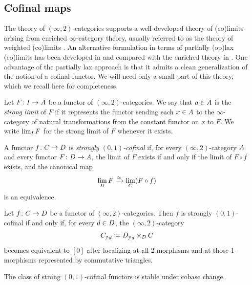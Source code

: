 \documentclass[a4paper,reqno,twoside]{amsart}
\begin{document}
\subsection{Cofinal maps}
The theory of $(\infty,2)$-categories supports a well-developed theory of (co)limits arising from enriched $\infty$-category theory, usually referred to as the theory of weighted (co)limits \cite{Heine2024HigherAlgebraWeightedColimits}. An alternative formulation in terms of partially (op)lax (co)limits has been developed in \cite{GagnaHarpazLanari2026MarkedLimits,AHM26} and compared with the enriched theory in \cite[Section 5.2]{AHM26}. One advantage of the partially lax approach is that it admits a clean generalization of the notion of a cofinal functor. We will need only a small part of this theory, which we recall here for completeness.

\begin{definition}
	Let $F \colon \relax{I} \to \relax{A}$ be a functor of $(\infty,2)$-categories. We say that $a \in \relax{A}$ is the \emph{strong limit} of $F$ if it represents the functor sending each $x \in \relax{A}$ to the $\infty$-category of natural transformations from the constant functor on $x$ to $F$. We write $\lim_{\relax{I}}F$ for the strong limit of $F$ whenever it exists.
\end{definition}


\begin{definition}\label{def:strongcofinal}
	A functor $f \colon \relax{C} \to \relax{D}$ is \emph{strongly $(0,1)$-cofinal} if, for every $(\infty,2)$-category $\relax{A}$ and every functor $F \colon \relax{D} \to \relax{A}$, the limit of $F$ exists if and only if the limit of $F\circ f$ exists, and the canonical map
	\[
		\lim_{\relax{D}}F \xrightarrow{\simeq} \lim_{\relax{C}}(F\circ f)
	\]
	is an equivalence.
\end{definition}

\begin{proposition}\label{prop:strongcofinalcharact}
	Let $f \colon \relax{C} \to \relax{D}$ be a functor of $(\infty,2)$-categories. Then $f$ is strongly $(0,1)$-cofinal if and only if, for every $d \in \relax{D}$, the $(\infty,2)$-category
	\[
		\cC_{\upslash d}\coloneq \cD_{\upslash d}\times_{\cD}\cC
	\]
	becomes equivalent to $[0]$ after localizing at all 2-morphisms and at those 1-morphisms represented by commutative triangles.
\end{proposition}

\begin{proposition}\label{prop:cofcobase}
	The class of strong $(0,1)$-cofinal functors is stable under cobase change.
\end{proposition}
\end{document}
